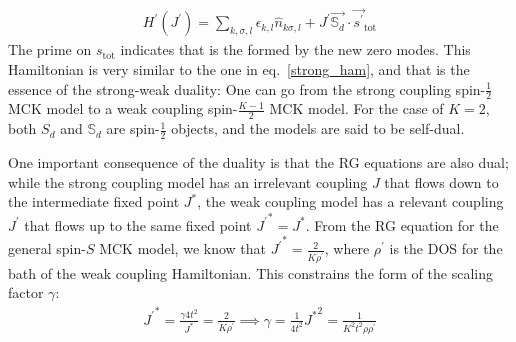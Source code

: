 \documentclass[12pt]{revtex4-2}
\begin{document}
\begin{equation}\begin{aligned}
	H^\prime(J^\prime) = \sum_{k,\sigma,l}\epsilon_{k,l} \hat n_{k\sigma,l} + J^\prime \vec{\mathbb{S}_d}\cdot\vec{s^\prime}_\text{tot}
\end{aligned}\end{equation}
The prime on \(s_\text{tot}\) indicates that is the formed by the new zero modes. This Hamiltonian is very similar to the one in eq.~\ref{strong_ham}, and that is the essence of the strong-weak duality: One can go from the strong coupling spin-\(\frac{1}{2}\) MCK model to a weak coupling spin-\(\frac{K-1}{2}\) MCK model. For the case of \(K=2\), both \(S_d\) and \(\mathbb{S}_d\) are spin-\(\frac{1}{2}\) objects, and the models are said to be self-dual.

One important consequence of the duality is that the RG equations are also dual; while the strong coupling model has an irrelevant coupling \(J\) that flows down to the intermediate fixed point \(J^*\), the weak coupling model has a relevant coupling \(J^\prime\) that flows up to the same fixed point \({J^\prime}^* = J^*\). From the RG equation for the general spin-\(S\) MCK model, we know that \({J^\prime}^* = \frac{2}{K \rho^\prime}\), where \(\rho^\prime\) is the DOS for the bath of the weak coupling Hamiltonian. This constrains the form of the scaling factor \(\gamma\):
\begin{equation}\begin{aligned}
	{J^\prime}^* = \frac{\gamma 4t^2}{J^*} = \frac{2}{K \rho^\prime} \implies \gamma = \frac{1}{4t^2} {J^*}^2 = \frac{1}{K^2 t^2 \rho \rho^\prime}
\end{aligned}\end{equation}
\end{document}
